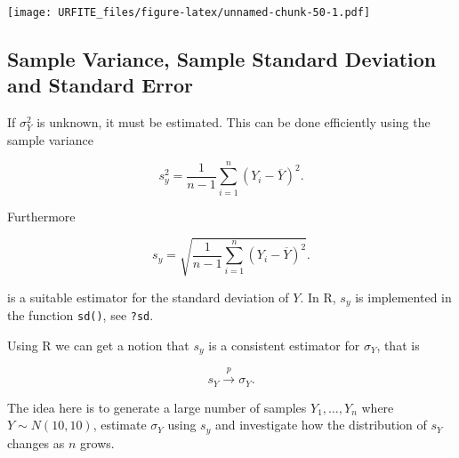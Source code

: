 \documentclass[]{book}
\theoremstyle{definition}
\theoremstyle{definition}
\theoremstyle{definition}
\theoremstyle{remark}
\begin{document}
\texttt{[image: URFITE\_files/figure-latex/unnamed-chunk-50-1.pdf]}

\subsection*{Sample Variance, Sample Standard Deviation and Standard
Error}\label{sample-variance-sample-standard-deviation-and-standard-error}

If \(\sigma^2_Y\) is unknown, it must be estimated. This can be done
efficiently using the sample variance

\begin{equation}
s_y^2 = \frac{1}{n-1} \sum_{i=1}^n (Y_i - \overline{Y})^2.
\end{equation}

Furthermore

\begin{equation}
s_y = \sqrt{\frac{1}{n-1} \sum_{i=1}^n (Y_i - \overline{Y})^2}.
\end{equation}

is a suitable estimator for the standard deviation of \(Y\). In R,
\(s_y\) is implemented in the function \texttt{sd()}, see \texttt{?sd}.

Using R we can get a notion that \(s_y\) is a consistent estimator for
\(\sigma_Y\), that is

\[ s_Y \overset{p}{\longrightarrow} \sigma_Y. \]

The idea here is to generate a large number of samples \(Y_1,\dots,Y_n\)
where \(Y\sim N(10,10)\), estimate \(\sigma_Y\) using \(s_y\) and
investigate how the distribution of \(s_Y\) changes as \(n\) grows.
\end{document}

